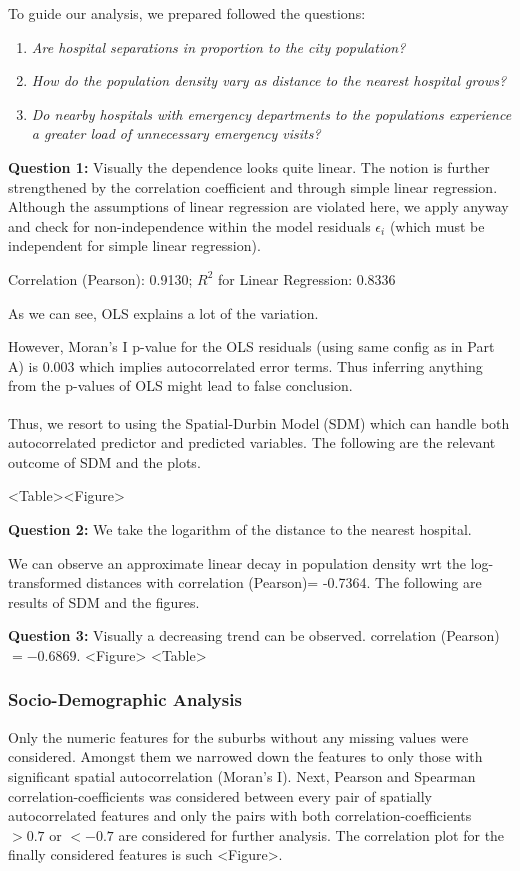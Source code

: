 \documentclass[
	a4paper, %
	10pt, %
	unnumberedsections, %
	twoside, %
]{LTJournalArticle}
\begin{document}
To guide our analysis, we prepared followed the questions:
\begin{enumerate}
  \item \textit{Are hospital separations in proportion to the city population?}
  \item \textit{How do the population density vary as distance to the nearest hospital grows?}
  \item \textit{Do nearby hospitals with emergency departments to the populations experience a greater load of unnecessary emergency visits?}
\end{enumerate}


\textbf{Question 1:} Visually the dependence looks quite linear. The notion is further strengthened by the correlation coefficient and through simple linear regression. Although the assumptions of linear regression are violated here, we apply anyway and check for non-independence within the model residuals $\epsilon_i$ (which must be independent for simple linear regression). 

Correlation (Pearson): 0.9130; $R^2$ for Linear Regression: 0.8336

As we can see, OLS explains a lot of the variation. 

However, Moran's I p-value for the OLS residuals (using same config as in Part A) is 0.003 which implies autocorrelated error terms. Thus inferring anything from the p-values of OLS might lead to false conclusion.

Thus, we resort to using the Spatial-Durbin Model\textsuperscript{\cite{atikah2021efficiency} \cite{Anselin1988} \cite{doi:10.1080/17421770601009841}} (SDM) which can handle both autocorrelated predictor and predicted variables. The following are the relevant outcome of SDM and the plots.

<Table><Figure>

\textbf{Question 2:} We take the logarithm of the distance to the nearest hospital.

We can observe an approximate linear decay in population density wrt the log-transformed distances with correlation (Pearson)= -0.7364. The following are results of SDM and the figures.

\textbf{Question 3:} Visually a decreasing trend can be observed. correlation (Pearson)$= -0.6869$. <Figure> <Table>


\subsubsection{Socio-Demographic Analysis}
Only the numeric features for the suburbs without any missing values were considered. Amongst them we narrowed down the features to only those with significant spatial autocorrelation (Moran's I). Next, Pearson and Spearman correlation-coefficients was considered between every pair of spatially autocorrelated features and only the pairs with both correlation-coefficients  $>0.7$ or $<-0.7$ are considered for further analysis. The correlation plot for the finally considered features is such <Figure>. 
\end{document}
